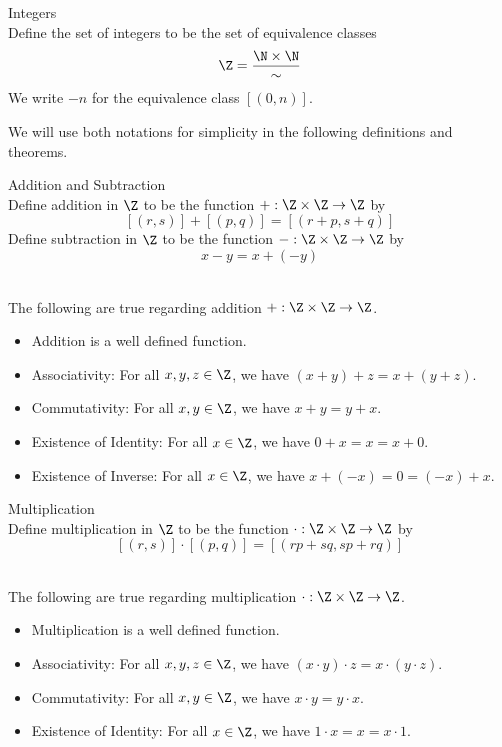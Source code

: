 \documentclass[a4paper]{article}
\begin{document}
\begin{defn}{Integers}{}\\
Define the set of integers to be the set of equivalence classes $$\Z=\frac{\N\times\N}{\sim}$$ We write $-n$ for the equivalence class $[(0,n)]$. 
\end{defn}

We will use both notations for simplicity in the following definitions and theorems. 

\begin{defn}{Addition and Subtraction}{}\\
Define addition in $\Z$ to be the function $+:\Z\times\Z\to\Z$ by $$[(r,s)]+[(p,q)]=[(r+p,s+q)]$$ Define subtraction in $\Z$ to be the function $-:\Z\times\Z\to\Z$ by $$x-y=x+(-y)$$
\end{defn}

\begin{lmm}{}{}\\
The following are true regarding addition $+:\Z\times\Z\to\Z$. 
\begin{itemize}
\item Addition is a well defined function. 
\item Associativity: For all $x,y,z\in\Z$, we have $(x+y)+z=x+(y+z)$. 
\item Commutativity: For all $x,y\in\Z$, we have $x+y=y+x$. 
\item Existence of Identity: For all $x\in\Z$, we have $0+x=x=x+0$. 
\item Existence of Inverse: For all $x\in\Z$, we have $x+(-x)=0=(-x)+x$. 
\end{itemize}
\end{lmm}

\begin{defn}{Multiplication}{}\\
Define multiplication in $\Z$ to be the function $\cdot:\Z\times\Z\to\Z$ by $$[(r,s)]\cdot[(p,q)]=[(rp+sq,sp+rq)]$$
\end{defn}

\begin{lmm}{}{}\\
The following are true regarding multiplication $\cdot:\Z\times\Z\to\Z$. 
\begin{itemize}
\item Multiplication is a well defined function. 
\item Associativity: For all $x,y,z\in\Z$, we have $(x\cdot y)\cdot z=x\cdot(y\cdot z)$. 
\item Commutativity: For all $x,y\in\Z$, we have $x\cdot y=y\cdot x$. 
\item Existence of Identity: For all $x\in\Z$, we have $1\cdot x=x=x\cdot 1$. 
\end{itemize}
\end{lmm}
\end{document}

